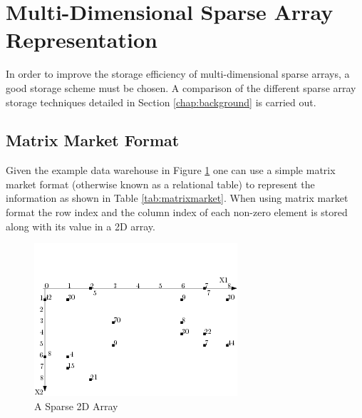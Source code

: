 \section{Multi-Dimensional Sparse Array Representation}
In order to improve the storage efficiency of multi-dimensional sparse arrays, a good storage scheme must be chosen. A comparison of the different sparse array storage techniques detailed in Section \ref{chap:background} is carried out.

\subsection{Matrix Market Format}

Given the example data warehouse in Figure \ref{fig:exampleMatrix} one can use a simple matrix market format (otherwise known as a relational table) to represent the information as shown in Table \ref{tab:matrixmarket}. When using matrix market format the row index and the column index of each non-zero element is stored along with its value in a 2D array.

 \begin{figure}[H]
	\centering
	\includegraphics[width=0.7\linewidth]{exampleMatrix}
	\caption{A Sparse 2D Array}
	\label{fig:exampleMatrix}
\end{figure}

